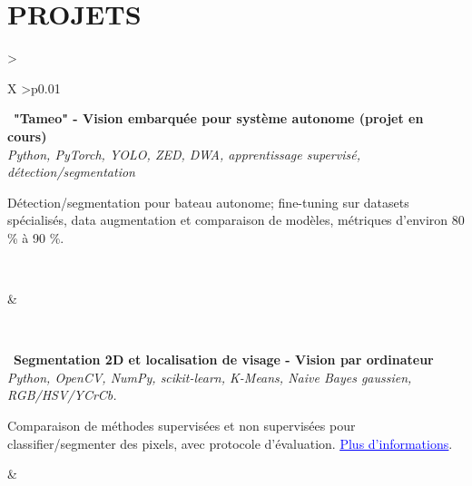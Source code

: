 \documentclass[letterpaper,10pt]{article}
\newcommand{\indentbox}[2][1em]{\hspace*{#1}\parbox{\dimexpr\linewidth-#1\relax}{#2}}
\begin{document}
\vspace{0.24cm}
\section{\textcolor{mydarkgreen}{\textbf{PROJETS}}}

  \begin{tabularx}{\textwidth}{>{\raggedright\arraybackslash}X >{\raggedleft\arraybackslash}p{0.01\textwidth}}
  
    \begin{minipage}[t]{\linewidth}\raggedright
      \textbullet\ \textbf{"Tameo" - Vision embarquée pour système autonome (projet en cours)}\\
      \textit{\footnotesize Python, PyTorch, YOLO, ZED, DWA, apprentissage supervisé, détection/segmentation}\\
      \indentbox{\footnotesize Détection/segmentation pour bateau autonome; fine-tuning sur datasets spécialisés, data augmentation et comparaison de modèles, métriques d'environ 80 \% à 90 \%.}\\
    \end{minipage}
    &
    \begin{minipage}[t]{\linewidth}\raggedleft %
    \end{minipage}\\

    \begin{minipage}[t]{\linewidth}\raggedright
      \textbullet\ \textbf{Segmentation 2D et localisation de visage - Vision par ordinateur}\\
      \textit{\footnotesize Python, OpenCV, NumPy, scikit-learn, K-Means, Naive Bayes gaussien, RGB/HSV/YCrCb.}\\
      \indentbox{\footnotesize Comparaison de méthodes supervisées et non supervisées pour classifier/segmenter des pixels, avec protocole d'évaluation. \href{https://github.com/JavierTarazona06/Vision_LocalFeatures_BayesianClassification_KMeans/blob/main/docs/rappport/rap.pdf}{\textcolor{blue}{\underline{Plus d'informations}}}.}
    \end{minipage}
    &
    \begin{minipage}[t]{\linewidth}\raggedleft %
    \end{minipage}\\

  \end{tabularx}
\end{document}
